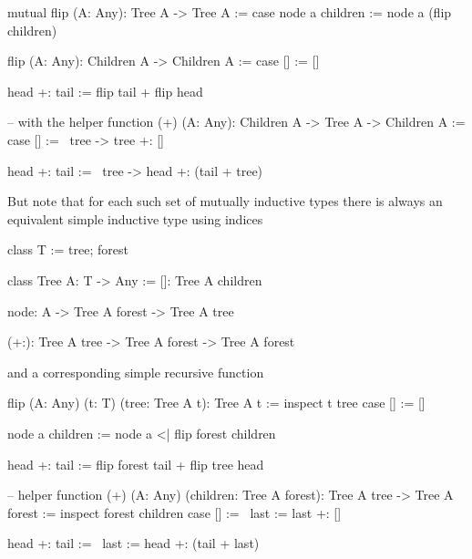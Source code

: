 \begin{alba}
    mutual
        flip (A: Any): Tree A -> Tree A
        :=
            case
                node a children :=
                    node a (flip children)

        flip (A: Any): Children A -> Children A
        :=
            case
                [] :=
                    []

                head +: tail :=
                    flip tail + flip head

    -- with the helper function
    (+) (A: Any): Children A -> Tree A -> Children A
    :=
        case
            [] :=
                \ tree -> tree +: []

            head +: tail :=
                \ tree ->
                    head +: (tail + tree)


\end{alba}






But note that for each such set of mutually inductive types there is always an
equivalent simple inductive type using indices
%
\begin{alba}
    class T := tree; forest

    class Tree A: T -> Any :=
        []: Tree A children

        node: A -> Tree A forest -> Tree A tree

        (+:): Tree A tree -> Tree A forest -> Tree A forest
\end{alba}
%
and a corresponding simple recursive function
%
\begin{alba}
    flip (A: Any) (t: T) (tree: Tree A t): Tree A t
    :=
        inspect t tree case
            [] :=
                []

            node a children :=
                node a <| flip forest children

            head +: tail :=
                flip forest tail + flip tree head

    -- helper function
    (+) (A: Any) (children: Tree A forest): Tree A tree -> Tree A forest
    :=
        inspect
            forest children
        case
            [] :=
                \ last := last +: []

            head +: tail :=
                \ last := head +: (tail + last)
\end{alba}

\begin{alba}
\end{alba}






